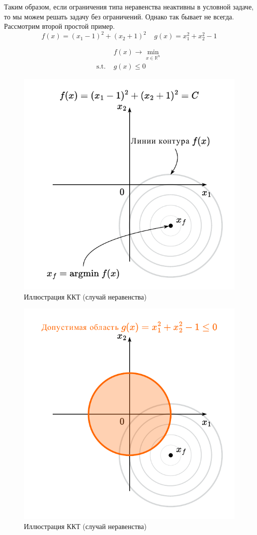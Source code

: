 \documentclass[
  russian,
  letterpaper,
  DIV=11,
  numbers=noendperiod]{scrartcl}
\begin{document}
Таким образом, если ограничения типа неравенства неактивны в условной
задаче, то мы можем решать задачу без ограничений. Однако так бывает не
всегда. Рассмотрим второй простой пример. \[
f(x) = (x_1 - 1)^2 + (x_2 + 1)^2 \;\;\;\; g(x) = x_1^2 + x_2^2 - 1
\]

\[
\begin{split}
& f(x) \to \min\limits_{x \in \mathbb{R}^n} \\
\text{s.t. } & g(x) \leq 0
\end{split}
\]

\begin{figure}[H]

{\centering \includegraphics[width=0.5\linewidth,height=\textheight,keepaspectratio]{graphon-ineq_constr_5_ru.pdf}

}

\caption{Иллюстрация ККТ (случай неравенства)}

\end{figure}%

\begin{figure}[H]

{\centering \includegraphics[width=0.5\linewidth,height=\textheight,keepaspectratio]{graphon-ineq_constr_6_ru.pdf}

}

\caption{Иллюстрация ККТ (случай неравенства)}

\end{figure}%
\end{document}
